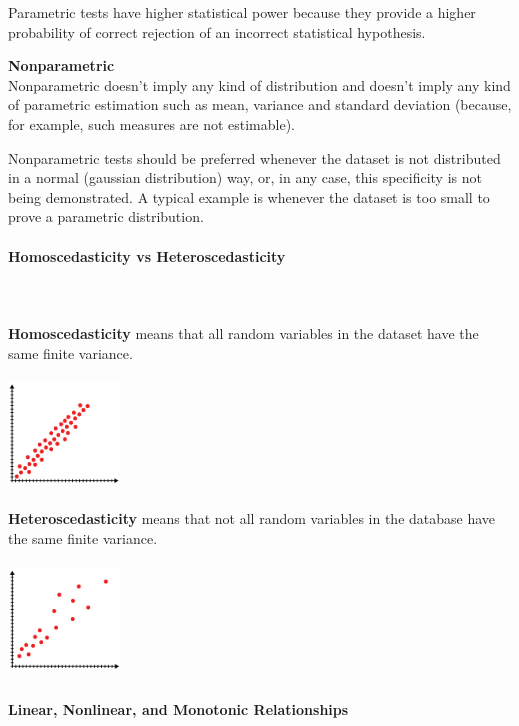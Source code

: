 \documentclass{article}
\begin{document}
Parametric tests have higher statistical power because they provide a higher probability of correct rejection of an incorrect statistical hypothesis. 

\textbf{Nonparametric}\mbox{} \\
Nonparametric doesn’t imply any kind of distribution and doesn’t imply any kind of parametric estimation such as mean, variance and standard deviation (because, for example, such measures are not estimable).

Nonparametric tests should be preferred whenever the dataset is not distributed in a normal (gaussian distribution) way, or, in any case, this specificity is not being demonstrated. A typical example is whenever the dataset is too small to prove a parametric distribution.

\paragraph{Homoscedasticity vs Heteroscedasticity}\mbox{} \\ 
\mbox{} \\

\textbf{Homoscedasticity} means that all random variables in the dataset have the same finite variance.

\includegraphics[width=3cm, height=3cm]{homoscedasticity}

\textbf{Heteroscedasticity}  means that not all random variables in the database have the same finite variance.

\includegraphics[width=3cm, height=3cm]{heteroscedasticity}

\paragraph{Linear, Nonlinear, and Monotonic Relationships}\mbox{} \\ 
\mbox{} \\
\end{document}
